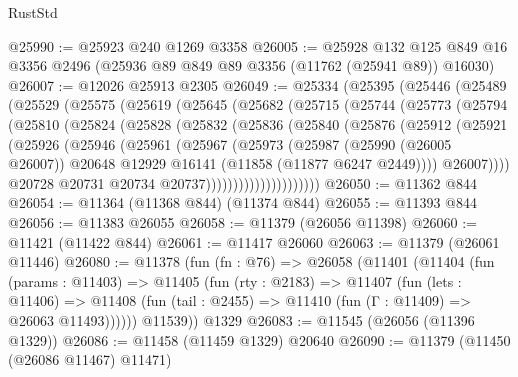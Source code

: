 \begin{lexlean}{RustStd}
\begin{coremodule}
@25990 := @25923 @240 @1269 @3358
@26005 := @25928
    @132
    @125
    @849
    @16
    @3356
    @2496
    (@25936 @89 @849 @89 @3356 (@11762 (@25941 @89)) @16030)
@26007 := @12026 @25913 @2305
@26049 := @25334
    (@25395
      (@25446
        (@25489
          (@25529
            (@25575
              (@25619
                (@25645
                  (@25682
                    (@25715
                      (@25744
                        (@25773
                          (@25794
                            (@25810
                              (@25824
                                (@25828
                                  (@25832
                                    (@25836
                                      (@25840
                                        (@25876
                                          (@25912
                                            (@25921
                                              (@25926
                                                (@25946
                                                  (@25961
                                                    (@25967
                                                      (@25973
                                                        (@25987
                                                          (@25990 (@26005 @26007))
                                                          @20648
                                                          @12929
                                                          @16141
                                                          (@11858 (@11877 @6247 @2449))))
                                                      @26007))))
                                              @20728
                                              @20731
                                              @20734
                                              @20737)))))))))))))))))))))
@26050 := @11362 @844
@26054 := @11364 (@11368 @844) (@11374 @844)
@26055 := @11393 @844
@26056 := @11383 @26055
@26058 := @11379 (@26056 @11398)
@26060 := @11421 (@11422 @844)
@26061 := @11417 @26060
@26063 := @11379 (@26061 @11446)
@26080 := @11378
    (fun (fn : @76) =>
    @26058
      (@11401
        (@11404
          (fun (params : @11403) =>
          @11405
            (fun (rty : @2183) =>
            @11407
              (fun (lets : @11406) =>
              @11408 (fun (tail : @2455) => @11410 (fun (Γ : @11409) => @26063 @11493))))))
        @11539))
    @1329
@26083 := @11545 (@26056 (@11396 @1329))
@26086 := @11458 (@11459 @1329) @20640
@26090 := @11379 (@11450 (@26086 @11467) @11471)

\end{coremodule}
\end{lexlean}
